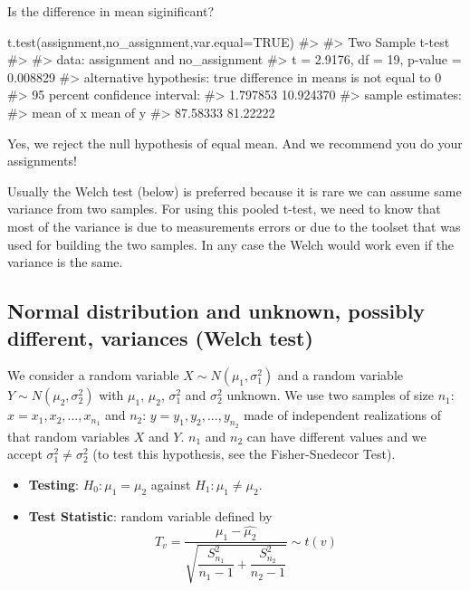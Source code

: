 \documentclass[
  letterpaper,
  DIV=11,
  numbers=noendperiod]{scrreprt}
\newenvironment{Shaded}{\begin{snugshade}}{\end{snugshade}}
\newcommand{\AttributeTok}[1]{\textcolor[rgb]{0.40,0.45,0.13}{#1}}
\newcommand{\CommentTok}[1]{\textcolor[rgb]{0.37,0.37,0.37}{#1}}
\newcommand{\ConstantTok}[1]{\textcolor[rgb]{0.56,0.35,0.01}{#1}}
\newcommand{\FunctionTok}[1]{\textcolor[rgb]{0.28,0.35,0.67}{#1}}
\newcommand{\NormalTok}[1]{\textcolor[rgb]{0.00,0.23,0.31}{#1}}
\providecommand{\tightlist}{%
  \setlength{\itemsep}{0pt}\setlength{\parskip}{0pt}}\usepackage{longtable,booktabs,array}
\begin{document}
Is the difference in mean siginificant?

\begin{Shaded}
\begin{Highlighting}[]
\FunctionTok{t.test}\NormalTok{(assignment,no\_assignment,}\AttributeTok{var.equal=}\ConstantTok{TRUE}\NormalTok{)}
\CommentTok{\#\textgreater{} }
\CommentTok{\#\textgreater{}  Two Sample t{-}test}
\CommentTok{\#\textgreater{} }
\CommentTok{\#\textgreater{} data:  assignment and no\_assignment}
\CommentTok{\#\textgreater{} t = 2.9176, df = 19, p{-}value = 0.008829}
\CommentTok{\#\textgreater{} alternative hypothesis: true difference in means is not equal to 0}
\CommentTok{\#\textgreater{} 95 percent confidence interval:}
\CommentTok{\#\textgreater{}   1.797853 10.924370}
\CommentTok{\#\textgreater{} sample estimates:}
\CommentTok{\#\textgreater{} mean of x mean of y }
\CommentTok{\#\textgreater{}  87.58333  81.22222}
\end{Highlighting}
\end{Shaded}

Yes, we reject the null hypothesis of equal mean. And we recommend you
do your assignments!

Usually the Welch test (below) is preferred because it is rare we can
assume same variance from two samples. For using this pooled t-test, we
need to know that most of the variance is due to measurements errors or
due to the toolset that was used for building the two samples. In any
case the Welch would work even if the variance is the same.

\subsection{Normal distribution and unknown, possibly different,
variances (Welch
test)}\label{normal-distribution-and-unknown-possibly-different-variances-welch-test}

We consider a random variable \(X \sim N(\mu_1, \sigma_1^2)\) and a
random variable \(Y \sim N(\mu_2, \sigma_2^2)\) with \(\mu_1\),
\(\mu_2\), \(\sigma_1^2\) and \(\sigma_2^2\) unknown. We use two samples
of size \(n_1\): \(x = {x_1, x_2,..., x_{n_1}}\) and \(n_2\):
\(y = {y_1, y_2,..., y_{n_2}}\) made of independent realizations of that
random variables \(X\) and \(Y\). \(n_1\) and \(n_2\) can have different
values and we accept \(\sigma^2_1 \ne \sigma^2_2\) (to test this
hypothesis, see the Fisher-Snedecor Test).

\begin{itemize}
\tightlist
\item
  \textbf{Testing}: \(H_0: \mu_1 = \mu_2\) against
  \(H_1: \mu_1 \neq \mu_2\).
\item
  \textbf{Test Statistic}: random variable defined by
  \[T_{v} = \dfrac{\hat{\mu_1} - \hat{\mu_2}}{\sqrt{\dfrac{S^2_{n_1}} {n_1 - 1} + \dfrac{S^2_{n_2}} {n_2 - 1}}} \sim t(v)\]
\end{itemize}
\end{document}
